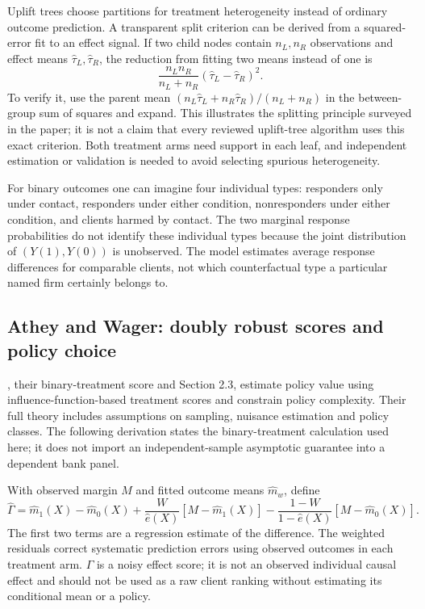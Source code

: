 Uplift trees choose partitions for treatment heterogeneity instead of ordinary outcome prediction. A transparent split criterion can be derived from a squared-error fit to an effect signal. If two child nodes contain $n_L,n_R$ observations and effect means $\widehat\tau_L,\widehat\tau_R$, the reduction from fitting two means instead of one is
\[
 \frac{n_Ln_R}{n_L+n_R}(\widehat\tau_L-\widehat\tau_R)^2.
\]
To verify it, use the parent mean $(n_L\widehat\tau_L+n_R\widehat\tau_R)/(n_L+n_R)$ in the between-group sum of squares and expand. This illustrates the splitting principle surveyed in the paper; it is not a claim that every reviewed uplift-tree algorithm uses this exact criterion. Both treatment arms need support in each leaf, and independent estimation or validation is needed to avoid selecting spurious heterogeneity.

For binary outcomes one can imagine four individual types: responders only under contact, responders under either condition, nonresponders under either condition, and clients harmed by contact. The two marginal response probabilities do not identify these individual types because the joint distribution of $(Y(1),Y(0))$ is unobserved. The model estimates average response differences for comparable clients, not which counterfactual type a particular named firm certainly belongs to.

\subsection{Athey and Wager: doubly robust scores and policy choice}

\citet{wager2021policy}, their binary-treatment score and Section 2.3, estimate policy value using influence-function-based treatment scores and constrain policy complexity. Their full theory includes assumptions on sampling, nuisance estimation and policy classes. The following derivation states the binary-treatment calculation used here; it does not import an independent-sample asymptotic guarantee into a dependent bank panel.

With observed margin $M$ and fitted outcome means $\widehat m_w$, define
\begin{equation}
 \widehat\Gamma=\widehat m_1(X)-\widehat m_0(X)
 +\frac{W}{\widehat e(X)}[M-\widehat m_1(X)]
 -\frac{1-W}{1-\widehat e(X)}[M-\widehat m_0(X)].
 \label{eq:dr-score}
\end{equation}
The first two terms are a regression estimate of the difference. The weighted residuals correct systematic prediction errors using observed outcomes in each treatment arm. $\widehat\Gamma$ is a noisy effect score; it is not an observed individual causal effect and should not be used as a raw client ranking without estimating its conditional mean or a policy.

